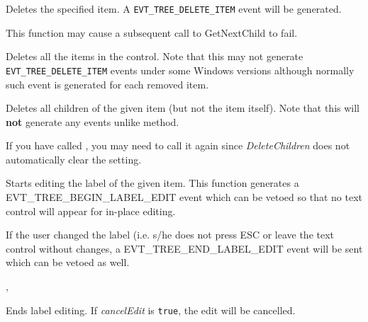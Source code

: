 
Deletes the specified item. A {\tt EVT\_TREE\_DELETE\_ITEM} event will be
generated.

This function may cause a subsequent call to GetNextChild to fail.


\label{wxtreectrldeleteallitems}


Deletes all the items in the control. Note that this may not generate 
{\tt EVT\_TREE\_DELETE\_ITEM} events under some Windows versions although
normally such event is generated for each removed item.


\label{wxtreectrldeletechildren}


Deletes all children of the given item (but not the item itself). Note that
this will {\bf not} generate any events unlike 
 method.

If you have called , you
may need to call it again since {\it DeleteChildren} does not automatically
clear the setting.


\label{wxtreectrleditlabel}


Starts editing the label of the given item. This function generates a
EVT\_TREE\_BEGIN\_LABEL\_EDIT event which can be vetoed so that no
text control will appear for in-place editing.

If the user changed the label (i.e. s/he does not press ESC or leave
the text control without changes, a EVT\_TREE\_END\_LABEL\_EDIT event
will be sent which can be vetoed as well.


,


\label{wxtreectrlendeditlabel}


Ends label editing. If {\it cancelEdit} is {\tt true}, the edit will be cancelled.

